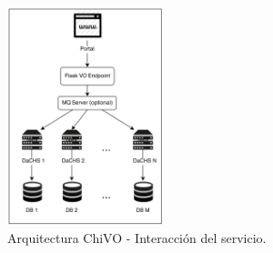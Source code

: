 \vspace{1.0cm}
\begin{figure}[h!t]
    \begin{center}
        \includegraphics[width=0.4\textwidth]{img/interaccion.png}
        \caption{Arquitectura ChiVO - Interacción del servicio.}
    \end{center}
\end{figure}
